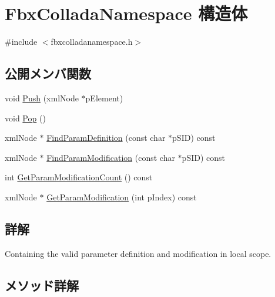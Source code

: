 \hypertarget{struct_fbx_collada_namespace}{}\section{Fbx\+Collada\+Namespace 構造体}
\label{struct_fbx_collada_namespace}


{\ttfamily \#include $<$fbxcolladanamespace.\+h$>$}

\subsection*{公開メンバ関数}
\begin{DoxyCompactItemize}
\item 
void \hyperlink{struct_fbx_collada_namespace_a844aeced65709b23349ed14e444c862b}{Push} (xml\+Node $\ast$p\+Element)
\item 
void \hyperlink{struct_fbx_collada_namespace_ae1748532010af20d42578135ba8fab6e}{Pop} ()
\item 
xml\+Node $\ast$ \hyperlink{struct_fbx_collada_namespace_a63ad15d7dec6e1a8095427f04dce860f}{Find\+Param\+Definition} (const char $\ast$p\+S\+ID) const
\item 
xml\+Node $\ast$ \hyperlink{struct_fbx_collada_namespace_a6061a9a88eecad58d7909ac84d7c0e73}{Find\+Param\+Modification} (const char $\ast$p\+S\+ID) const
\item 
int \hyperlink{struct_fbx_collada_namespace_a0f8447e3228c77bca4f9a1ad2f759e1d}{Get\+Param\+Modification\+Count} () const
\item 
xml\+Node $\ast$ \hyperlink{struct_fbx_collada_namespace_a5bf3b2e91505df6ef9621e79349a14d7}{Get\+Param\+Modification} (int p\+Index) const
\end{DoxyCompactItemize}


\subsection{詳解}
Containing the valid parameter definition and modification in local scope. 

\subsection{メソッド詳解}
\mbox{\label{struct_fbx_collada_namespace_a63ad15d7dec6e1a8095427f04dce860f}} 
